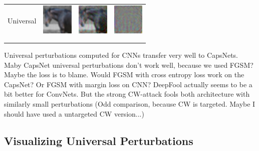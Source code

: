 \documentclass{article}
\begin{document}
\begin{table}[h]
\begin{tabular}{rlll}
	\\
	Universal & \includegraphics[height=1.5cm, align=c]{figures/universal_orig.pdf} & \includegraphics[height=1.5cm, align=c]{figures/universal_adversarial.pdf} & \includegraphics[height=1.5cm, align=c]{figures/universal_diff.pdf}\\
	\\
	\vspace{0.1cm}\\
	\end{tabular}
	\label{tab:images}
\end{table}

Universal perturbations computed for CNNs transfer very well to CapsNets. Maby CapsNet universal perturbations don't work well, because we used FGSM? Maybe the loss is to blame. Would FGSM with cross entropy loss work on the CapsNet? Or FGSM with margin loss on CNN?
DeepFool actually seems to be a bit better for ConvNets. But the strong CW-attack fools both architecture with similarly small perturbations (Odd comparison, because CW is targeted. Maybe I should have used a untargeted CW version...)

\subsection{Visualizing Universal Perturbations}
\end{document}
